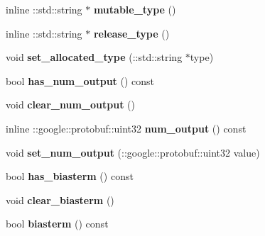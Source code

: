 \begin{DoxyCompactItemize}
inline \+::std\+::string $\ast$ {\bfseries mutable\+\_\+type} ()
\item 
\mbox{\label{classcaffe_1_1_v0_layer_parameter_adcb779e0ba1a993fb210faa64d644448}} 
inline \+::std\+::string $\ast$ {\bfseries release\+\_\+type} ()
\item 
\mbox{\label{classcaffe_1_1_v0_layer_parameter_af4264457c28b02d7a45be7e26fcb5d1a}} 
void {\bfseries set\+\_\+allocated\+\_\+type} (\+::std\+::string $\ast$type)
\item 
\mbox{\label{classcaffe_1_1_v0_layer_parameter_aae456f24dd318c7f45ce44555ec7a9af}} 
bool {\bfseries has\+\_\+num\+\_\+output} () const
\item 
\mbox{\label{classcaffe_1_1_v0_layer_parameter_a5f98b9110a716431194c758fc385c5c0}} 
void {\bfseries clear\+\_\+num\+\_\+output} ()
\item 
\mbox{\label{classcaffe_1_1_v0_layer_parameter_a5bf5c73476ecef711e40e692abf17c90}} 
inline \+::google\+::protobuf\+::uint32 {\bfseries num\+\_\+output} () const
\item 
\mbox{\label{classcaffe_1_1_v0_layer_parameter_a6ff39f2f19bc51dbf9bf4a51805a104c}} 
void {\bfseries set\+\_\+num\+\_\+output} (\+::google\+::protobuf\+::uint32 value)
\item 
\mbox{\label{classcaffe_1_1_v0_layer_parameter_a8755206388bcc8282cc27b81c22ca4ed}} 
bool {\bfseries has\+\_\+biasterm} () const
\item 
\mbox{\label{classcaffe_1_1_v0_layer_parameter_ae17eb504f10cb254ffecb12476febfff}} 
void {\bfseries clear\+\_\+biasterm} ()
\item 
\mbox{\label{classcaffe_1_1_v0_layer_parameter_af71fef496e1a60cb64538c01abad85e8}} 
bool {\bfseries biasterm} () const
\item 
\mbox{\label{classcaffe_1_1_v0_layer_parameter_a502bceab1690c5c1c79f6937bdc8ad4b}} 

\end{DoxyCompactItemize}
